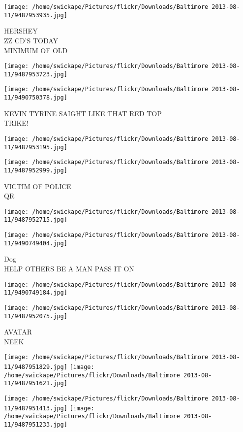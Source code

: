 \documentclass[10pt,letterpaper]{article}
\begin{document}
\texttt{[image: /home/swickape/Pictures/flickr/Downloads/Baltimore 2013-08-11/9487953935.jpg]}

HERSHEY\\
ZZ CD'S TODAY\\
MINIMUM OF OLD
\pagebreak

\texttt{[image: /home/swickape/Pictures/flickr/Downloads/Baltimore 2013-08-11/9487953723.jpg]}

\vspace{0.25in}
\texttt{[image: /home/swickape/Pictures/flickr/Downloads/Baltimore 2013-08-11/9490750378.jpg]}

KEVIN TYRINE SAIGHT LIKE THAT RED TOP\\
TRIKE!
\pagebreak

\texttt{[image: /home/swickape/Pictures/flickr/Downloads/Baltimore 2013-08-11/9487953195.jpg]}

\vspace{0.25in}
\texttt{[image: /home/swickape/Pictures/flickr/Downloads/Baltimore 2013-08-11/9487952999.jpg]}

VICTIM OF POLICE\\
QR
\pagebreak

\texttt{[image: /home/swickape/Pictures/flickr/Downloads/Baltimore 2013-08-11/9487952715.jpg]}

\vspace{0.25in}
\texttt{[image: /home/swickape/Pictures/flickr/Downloads/Baltimore 2013-08-11/9490749404.jpg]}

Dog\\
HELP OTHERS BE A MAN PASS IT ON
\pagebreak

\texttt{[image: /home/swickape/Pictures/flickr/Downloads/Baltimore 2013-08-11/9490749184.jpg]}

\vspace{0.25in}
\texttt{[image: /home/swickape/Pictures/flickr/Downloads/Baltimore 2013-08-11/9487952075.jpg]}

AVATAR\\
NEEK
\pagebreak

\texttt{[image: /home/swickape/Pictures/flickr/Downloads/Baltimore 2013-08-11/9487951829.jpg]}
\texttt{[image: /home/swickape/Pictures/flickr/Downloads/Baltimore 2013-08-11/9487951621.jpg]}

\texttt{[image: /home/swickape/Pictures/flickr/Downloads/Baltimore 2013-08-11/9487951413.jpg]}
\texttt{[image: /home/swickape/Pictures/flickr/Downloads/Baltimore 2013-08-11/9487951233.jpg]}
\end{document}
